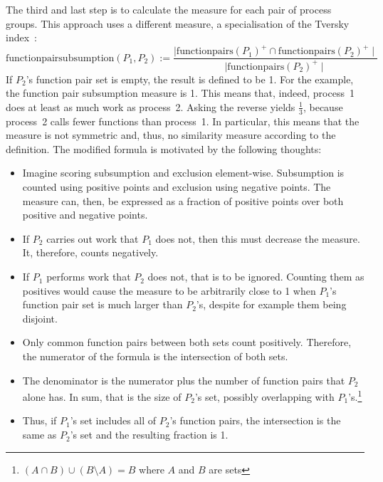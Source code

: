\documentclass[a4paper, final, diplominf]{zih-template}
\begin{document}
The third and last step is to calculate the measure for each pair of process groups.
This approach uses a different measure, a specialisation of the Tversky index~\cite{tversky77}:
\begin{equation*}
	\text{functionpairsubsumption}(P_1, P_2) := \frac{ \mid \text{functionpairs}(P_1)^+ \cap \text{functionpairs}(P_2)^+ \mid }{ \mid \text{functionpairs}(P_2)^+ \mid }
\end{equation*}
If $P_2$'s function pair set is empty, the result is defined to be 1.
For the example, the function pair subsumption measure is 1.
This means that, indeed, process~1 does at least as much work as process~2.
Asking the reverse yields $\frac{1}{3}$, because process~2 calls fewer functions than process~1.
In particular, this means that the measure is not symmetric and, thus, no similarity measure according to the definition.
The modified formula is motivated by the following thoughts:
\begin{itemize}
	\item Imagine scoring subsumption and exclusion element-wise. Subsumption is counted using positive points and exclusion using negative points.
		The measure can, then, be expressed as a fraction of positive points over both positive and negative points.
	\item If $P_2$ carries out work that $P_1$ does not, then this must decrease the measure.
		It, therefore, counts negatively.\vspace{-0.5ex}
	\item If $P_1$ performs work that $P_2$ does not, that is to be ignored.
		Counting them as positives would cause the measure to be arbitrarily close to 1 when $P_1$'s function pair set is much larger than $P_2$'s, despite for example them being disjoint.\vspace{-0.5ex}
	\item Only common function pairs between both sets count positively.
		Therefore, the numerator of the formula is the intersection of both sets.\vspace{-0.5ex}
	\item The denominator is the numerator plus the number of function pairs that $P_2$ alone has.
		In sum, that is the size of $P_2$'s set, possibly overlapping with $P_1$'s.\footnote{$(A \cap B) \cup (B \setminus A) = B$ where $A$ and $B$ are sets}\vspace{-0.5ex}
	\item Thus, if $P_1$'s set includes all of $P_2$'s function pairs, the intersection is the same as $P_2$'s set and the resulting fraction is 1.
\end{itemize}
\end{document}
